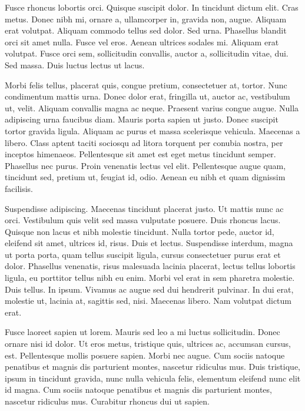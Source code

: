 Fusce rhoncus lobortis orci. Quisque suscipit dolor. In tincidunt dictum
elit. Cras metus. Donec nibh mi, ornare a, ullamcorper in, gravida non,
augue. Aliquam erat volutpat. Aliquam commodo tellus sed dolor. Sed urna.
Phasellus blandit orci sit amet nulla. Fusce vel eros. Aenean ultrices
sodales mi. Aliquam erat volutpat. Fusce orci sem, sollicitudin convallis,
auctor a, sollicitudin vitae, dui. Sed massa. Duis luctus lectus ut lacus.

Morbi felis tellus, placerat quis, congue pretium, consectetuer at, tortor.
Nunc condimentum mattis urna. Donec dolor erat, fringilla ut, auctor ac,
vestibulum ut, velit. Aliquam convallis magna ac neque. Praesent varius
congue augue. Nulla adipiscing urna faucibus diam. Mauris porta sapien ut
justo. Donec suscipit tortor gravida ligula. Aliquam ac purus et massa
scelerisque vehicula. Maecenas a libero. Class aptent taciti sociosqu ad
litora torquent per conubia nostra, per inceptos himenaeos. Pellentesque
sit amet est eget metus tincidunt semper. Phasellus nec purus. Proin
venenatis lectus vel elit. Pellentesque augue quam, tincidunt sed, pretium
ut, feugiat id, odio. Aenean eu nibh et quam dignissim facilisis.

Suspendisse adipiscing. Maecenas tincidunt placerat justo. Ut mattis nunc ac
orci. Vestibulum quis velit sed massa vulputate posuere. Duis rhoncus lacus.
Quisque non lacus et nibh molestie tincidunt. Nulla tortor pede, auctor id,
eleifend sit amet, ultrices id, risus. Duis et lectus. Suspendisse interdum,
magna ut porta porta, quam tellus suscipit ligula, cursus consectetuer purus
erat et dolor. Phasellus venenatis, risus malesuada lacinia placerat, lectus
tellus lobortis ligula, eu porttitor tellus nibh eu enim. Morbi vel erat in
sem pharetra molestie. Duis tellus. In ipsum. Vivamus ac augue sed dui
hendrerit pulvinar. In dui erat, molestie ut, lacinia at, sagittis sed, nisi.
Maecenas libero. Nam volutpat dictum erat.

Fusce laoreet sapien ut lorem. Mauris sed leo a mi luctus sollicitudin.
Donec ornare nisi id dolor. Ut eros metus, tristique quis, ultrices ac,
accumsan cursus, est. Pellentesque mollis posuere sapien. Morbi nec augue.
Cum sociis natoque penatibus et magnis dis parturient montes, nascetur
ridiculus mus. Duis tristique, ipsum in tincidunt gravida, nunc nulla
vehicula felis, elementum eleifend nunc elit id magna. Cum sociis natoque
penatibus et magnis dis parturient montes, nascetur ridiculus mus. Curabitur
rhoncus dui ut sapien.

